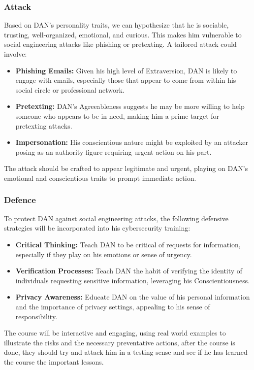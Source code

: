 \subsubsection{Attack}
Based on DAN's personality traits, we can hypothesize that he is sociable, trusting, well-organized, emotional, and curious. This makes him vulnerable to social engineering attacks like phishing or pretexting. A tailored attack could involve:

\begin{itemize}
    \item \textbf{Phishing Emails:} Given his high level of Extraversion, DAN is likely to engage with emails, especially those that appear to come from within his social circle or professional network.
    \item \textbf{Pretexting:} DAN's Agreeableness suggests he may be more willing to help someone who appears to be in need, making him a prime target for pretexting attacks.
    \item \textbf{Impersonation:} His conscientious nature might be exploited by an attacker posing as an authority figure requiring urgent action on his part.
\end{itemize}

The attack should be crafted to appear legitimate and urgent, playing on DAN's emotional and conscientious traits to prompt immediate action.



\subsubsection{Defence}
To protect DAN against social engineering attacks, the following defensive strategies will be incorporated into his cybersecurity training:

\begin{itemize}
    \item \textbf{Critical Thinking:} Teach DAN to be critical of requests for information, especially if they play on his emotions or sense of urgency.
    \item \textbf{Verification Processes:} Teach DAN the habit of verifying the identity of individuals requesting sensitive information, leveraging his Conscientiousness.
    \item \textbf{Privacy Awareness:} Educate DAN on the value of his personal information and the importance of privacy settings, appealing to his sense of responsibility.
\end{itemize}

The course will be interactive and engaging, using real world examples to illustrate the risks and the necessary preventative actions, after the course is done, they should
try and attack him in a testing sense and see if he has learned the course the important lessons.
